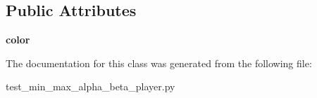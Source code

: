 \subsection*{Public Attributes}
\begin{DoxyCompactItemize}
\item 
\hypertarget{class_tabuleiro_othello-fork_1_1models_1_1players_1_1test__min__max__alpha__beta__player_1_1_minmax_player_a5e2bfbd500ca0ffc6cf33fe3a5b9c916}{}{\bfseries color}\label{class_tabuleiro_othello-fork_1_1models_1_1players_1_1test__min__max__alpha__beta__player_1_1_minmax_player_a5e2bfbd500ca0ffc6cf33fe3a5b9c916}

\end{DoxyCompactItemize}


The documentation for this class was generated from the following file\+:\begin{DoxyCompactItemize}
\item 
test\+\_\+min\+\_\+max\+\_\+alpha\+\_\+beta\+\_\+player.\+py\end{DoxyCompactItemize}
